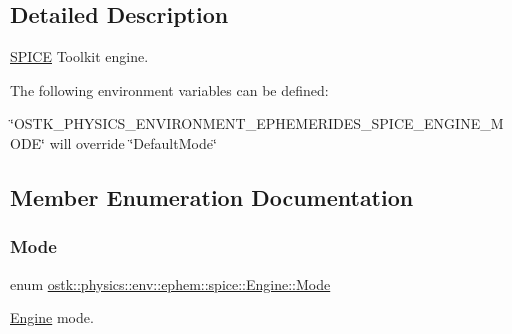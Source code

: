 \subsection{Detailed Description}
\hyperlink{classostk_1_1physics_1_1env_1_1ephem_1_1_s_p_i_c_e}{S\+P\+I\+CE} Toolkit engine. 

The following environment variables can be defined\+:


\begin{DoxyItemize}
\item \char`\"{}\+O\+S\+T\+K\+\_\+\+P\+H\+Y\+S\+I\+C\+S\+\_\+\+E\+N\+V\+I\+R\+O\+N\+M\+E\+N\+T\+\_\+\+E\+P\+H\+E\+M\+E\+R\+I\+D\+E\+S\+\_\+\+S\+P\+I\+C\+E\+\_\+\+E\+N\+G\+I\+N\+E\+\_\+\+M\+O\+D\+E\char`\"{} will override \char`\"{}\+Default\+Mode\char`\"{} 
\end{DoxyItemize}

\subsection{Member Enumeration Documentation}
\mbox{\label{classostk_1_1physics_1_1env_1_1ephem_1_1spice_1_1_engine_a803b82d8f41c81e861852098b6b75ae2}} 
\subsubsection{\texorpdfstring{Mode}{Mode}}
{\footnotesize\ttfamily enum \hyperlink{classostk_1_1physics_1_1env_1_1ephem_1_1spice_1_1_engine_a803b82d8f41c81e861852098b6b75ae2}{ostk\+::physics\+::env\+::ephem\+::spice\+::\+Engine\+::\+Mode}\hspace{0.3cm}{\ttfamily [strong]}}



\hyperlink{classostk_1_1physics_1_1env_1_1ephem_1_1spice_1_1_engine}{Engine} mode. 

